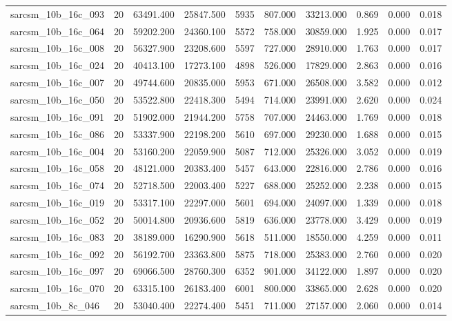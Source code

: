\begin{tabular}{lrrrrrrrrr}
sarcsm\_10b\_16c\_093 & 20 & 63491.400 & 25847.500 & 5935 & 807.000 & 33213.000 & 0.869 & 0.000 & 0.018 \\
sarcsm\_10b\_16c\_064 & 20 & 59202.200 & 24360.100 & 5572 & 758.000 & 30859.000 & 1.925 & 0.000 & 0.017 \\
sarcsm\_10b\_16c\_008 & 20 & 56327.900 & 23208.600 & 5597 & 727.000 & 28910.000 & 1.763 & 0.000 & 0.017 \\
sarcsm\_10b\_16c\_024 & 20 & 40413.100 & 17273.100 & 4898 & 526.000 & 17829.000 & 2.863 & 0.000 & 0.016 \\
sarcsm\_10b\_16c\_007 & 20 & 49744.600 & 20835.000 & 5953 & 671.000 & 26508.000 & 3.582 & 0.000 & 0.012 \\
sarcsm\_10b\_16c\_050 & 20 & 53522.800 & 22418.300 & 5494 & 714.000 & 23991.000 & 2.620 & 0.000 & 0.024 \\
sarcsm\_10b\_16c\_091 & 20 & 51902.000 & 21944.200 & 5758 & 707.000 & 24463.000 & 1.769 & 0.000 & 0.018 \\
sarcsm\_10b\_16c\_086 & 20 & 53337.900 & 22198.200 & 5610 & 697.000 & 29230.000 & 1.688 & 0.000 & 0.015 \\
sarcsm\_10b\_16c\_004 & 20 & 53160.200 & 22059.900 & 5087 & 712.000 & 25326.000 & 3.052 & 0.000 & 0.019 \\
sarcsm\_10b\_16c\_058 & 20 & 48121.000 & 20383.400 & 5457 & 643.000 & 22816.000 & 2.786 & 0.000 & 0.016 \\
sarcsm\_10b\_16c\_074 & 20 & 52718.500 & 22003.400 & 5227 & 688.000 & 25252.000 & 2.238 & 0.000 & 0.015 \\
sarcsm\_10b\_16c\_019 & 20 & 53317.100 & 22297.000 & 5601 & 694.000 & 24097.000 & 1.339 & 0.000 & 0.018 \\
sarcsm\_10b\_16c\_052 & 20 & 50014.800 & 20936.600 & 5819 & 636.000 & 23778.000 & 3.429 & 0.000 & 0.019 \\
sarcsm\_10b\_16c\_083 & 20 & 38189.000 & 16290.900 & 5618 & 511.000 & 18550.000 & 4.259 & 0.000 & 0.011 \\
sarcsm\_10b\_16c\_092 & 20 & 56192.700 & 23363.800 & 5875 & 718.000 & 25383.000 & 2.760 & 0.000 & 0.020 \\
sarcsm\_10b\_16c\_097 & 20 & 69066.500 & 28760.300 & 6352 & 901.000 & 34122.000 & 1.897 & 0.000 & 0.020 \\
sarcsm\_10b\_16c\_070 & 20 & 63315.100 & 26183.400 & 6001 & 800.000 & 33865.000 & 2.628 & 0.000 & 0.020 \\
sarcsm\_10b\_8c\_046 & 20 & 53040.400 & 22274.400 & 5451 & 711.000 & 27157.000 & 2.060 & 0.000 & 0.014 \\

\end{tabular}
